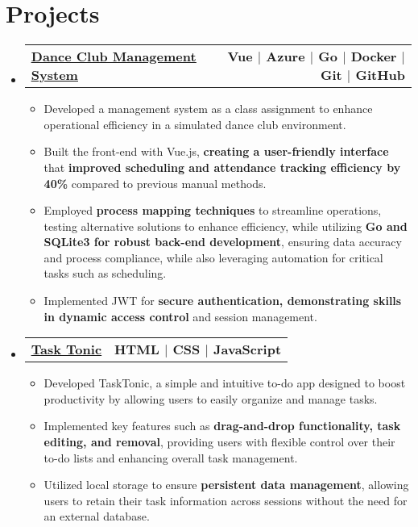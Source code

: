 \documentclass[letterpaper,11pt]{article}
\makeatletter
\newcommand{\resumeItem}[1]{
  \item\small{
    {#1 \vspace{-2pt}}
  }
}
\newcommand{\resumeProjectHeading}[2]{
    \item
    \begin{tabular*}{1.00\textwidth}{l@{\extracolsep{\fill}}r}
      \small#1 & #2 \\
    \end{tabular*}\vspace{-7pt}
    
}
\newcommand{\resumeSubHeadingListStart}{\begin{itemize}[leftmargin=0.0in, label={}]}
\newcommand{\resumeSubHeadingListEnd}{\end{itemize} \vspace{-18pt}}
\newcommand{\resumeItemListStart}{\begin{itemize}}
\newcommand{\resumeItemListEnd}{\end{itemize}\vspace{-4pt}}
\makeatother
\begin{document}
\section{Projects}
    \resumeSubHeadingListStart
      \vspace{-3pt}
      \resumeProjectHeading
        {
        \textbf{\href{https://github.com/Kyoko522/Dance-Club-Management-App}
        {\color{blue}\underline{Dance Club Management System}}}
        }{\textbf{Vue $|$ Azure $|$ Go $|$ Docker $|$ Git $|$ GitHub}}
        \resumeItemListStart
            \resumeItem{Developed a management system as a class assignment to enhance operational efficiency in a simulated dance club environment.}
            \resumeItem{Built the front-end with Vue.js, \textbf{creating a user-friendly interface} that \textbf{improved scheduling and attendance tracking efficiency by 40\%} compared to previous manual methods. }
            \resumeItem{Employed \textbf{process mapping techniques} to streamline operations, testing alternative solutions to enhance efficiency, while utilizing \textbf{Go and SQLite3 for robust back-end development}, ensuring data accuracy and process compliance, while also leveraging automation for critical tasks such as scheduling.}
            \resumeItem{Implemented JWT for \textbf{secure authentication, demonstrating skills in dynamic access control} and session management.}
          \resumeItemListEnd
      \vspace{-7pt}
      \resumeProjectHeading
          {
          \textbf{\href{https://tasktonic.netlify.app/}{\color{blue}\underline{Task Tonic}}}
          }{\textbf{HTML $|$ CSS $|$ JavaScript}}
          \resumeItemListStart
            \resumeItem{Developed TaskTonic, a simple and intuitive to-do app designed to boost productivity by allowing users to easily organize and manage tasks.}
            \resumeItem{Implemented key features such as \textbf{drag-and-drop functionality, task editing, and removal}, providing users with flexible control over their to-do lists and enhancing overall task management.}
            \resumeItem{Utilized local storage to ensure \textbf{persistent data management}, allowing users to retain their task information across sessions without the need for an external database.}
          \resumeItemListEnd
      \vspace{-3pt}
    \resumeSubHeadingListEnd
    
%
\end{document}
